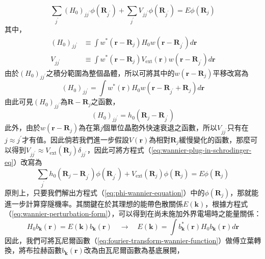\begin{equation}
\label{eq:wannier-plug-in-schrodinger-eq}
\sum_{j^\prime}(H_0)_{jj^\prime}\phi(\mathbf{R}_{j^\prime})+\sum_{j^\prime}V_{jj^\prime}\phi(\mathbf{R}_{j^\prime})=E\phi(\mathbf{R}_j)
\end{equation}
其中，
\begin{equation}
\begin{aligned}
(H_0)_{jj^\prime}&\equiv\int w^*(\mathbf{r}-\mathbf{R}_{j})H_0w(\mathbf{r}-\mathbf{R}_{j^\prime})d\mathbf{r}\\[5pt]
V_{jj^\prime}&\equiv\int w^*(\mathbf{r}-\mathbf{R}_j)V_\text{ext}(\mathbf{r})w(\mathbf{r}-\mathbf{R}_{j^\prime})d\mathbf{r}
\end{aligned}
\end{equation}
由於$(H_0)_{jj^\prime}$之積分範圍為整個晶體，所以可將其中的$w(\mathbf{r}-\mathbf{R}_j)$平移改寫為
\begin{equation}
(H_0)_{jj^\prime}=\int w^*(\mathbf{r})H_0w(\mathbf{r}-\mathbf{R}_{j^\prime}+\mathbf{R}_j)d\mathbf{r}
\end{equation}
由此可見$(H_0)_{jj^\prime}$為$\mathbf{R}-\mathbf{R}_j$之函數，
\begin{equation}
(H_0)_{jj^\prime}=h_0(\mathbf{R}_j-\mathbf{R}_{j^\prime})
\end{equation}
此外，由於$w(\mathbf{r}-\mathbf{R}_j)$為在第$j$個單位晶胞外快速衰退之函數，所以$V_{jj^\prime}$只有在$j\approx j^\prime$才有值。因此倘若我們進一步假設$V(\mathbf{r})$為相對$\mathbf{R}_j$緩慢變化的函數，那麼可以得到$V_{jj^\prime}\approx V_\text{ext}(\mathbf{R}_j)\delta_{jj^\prime}$，因此可將方程式（\ref{eq:wannier-plug-in-schrodinger-eq}）改寫為
\begin{equation}
\label{eq:phi-wannier-equation}
\sum_{j^\prime}h_0(\mathbf{R}_j-\mathbf{R}_{j^\prime})\phi(\mathbf{R}_{j^\prime})+V_\text{ext}(\mathbf{R}_j)\phi(\mathbf{R}_j)=E\phi(\mathbf{R}_j)
\end{equation}
\hspace{2em}原則上，只要我們解出方程式（\ref{eq:phi-wannier-equation}）中的$\phi(\mathbf{R}_j)$，那就能進一步計算穿隧機率。其關鍵在於其理想的能帶色散關係$E(\mathbf{k})$，根據方程式（\ref{eq:wannier-perturbation-form}），可以得到在尚未施加外界電場時之能量關係：
\begin{equation}
\label{eq:EMA-energy-dispersion}
H_0b_\mathbf{k}(\mathbf{r})=E(\mathbf{k})b_\mathbf{k}(\mathbf{r})\quad\to\quad E(\mathbf{k})=\int b_\mathbf{k}^*(\mathbf{r})H_0b_\mathbf{k}(\mathbf{r})d\mathbf{r}
\end{equation}
因此，我們可將瓦尼爾函數（\ref{eq:fourier-transform-wannier-function}）做傅立葉轉換，將布拉赫函數$b_\mathbf{k}(\mathbf{r})$改為由瓦尼爾函數為基底展開，
